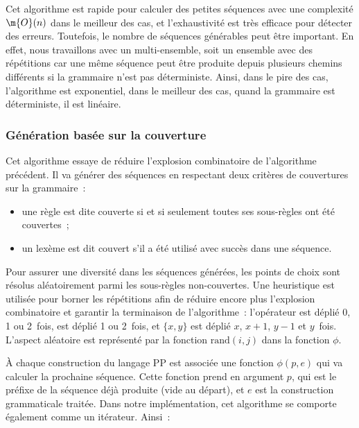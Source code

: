 Cet algorithme est rapide pour calculer des petites séquences avec une
complexité $\m{O}(n)$ dans le meilleur des cas, et l'exhaustivité est très
efficace pour détecter des erreurs. Toutefois, le nombre de séquences générables
peut être important. En effet, nous travaillons avec un multi-ensemble, soit un
ensemble avec des répétitions car une même séquence peut être produite depuis
plusieurs chemins différents si la grammaire n'est pas déterministe. Ainsi, dans
le pire des cas, l'algorithme est exponentiel, dans le meilleur des cas, quand
la grammaire est déterministe, il est linéaire.

\subsubsection{Génération basée sur la couverture}
\label{subsection:data:coverage_based_generation}

Cet algorithme essaye de réduire l'explosion combinatoire de l'algorithme
précédent. Il va générer des séquences en respectant deux critères de
couvertures sur la grammaire~:
%
\begin{itemize}

\item une règle est dite couverte si et si seulement toutes ses sous-règles ont
été couvertes~;

\item un lexème est dit couvert s'il a été utilisé avec succès dans une
séquence.

\end{itemize}
%
Pour assurer une diversité dans les séquences générées, les points de choix sont
résolus aléatoirement parmi les sous-règles non-couvertes. Une heuristique est
utilisée pour borner les répétitions afin de réduire encore plus l'explosion
combinatoire et garantir la terminaison de l'algorithme~: l'opérateur \code{*}
est déplié 0, 1 ou 2~fois, \code{+} est déplié 1 ou 2~fois, et $\{x, y\}$ est
déplié $x$, $x + 1$, $y - 1$ et $y$~fois. L'aspect aléatoire est représenté par
la fonction $\mathrm{rand}(i, j)$ dans la fonction $\phi$.

À chaque construction du langage PP est associée une fonction $\phi(p, e)$ qui
va calculer la prochaine séquence. Cette fonction prend en argument $p$, qui est
le préfixe de la séquence déjà produite (vide au départ), et $e$ est la
construction grammaticale traitée. Dans notre implémentation, cet algorithme se
comporte également comme un itérateur. Ainsi~:

